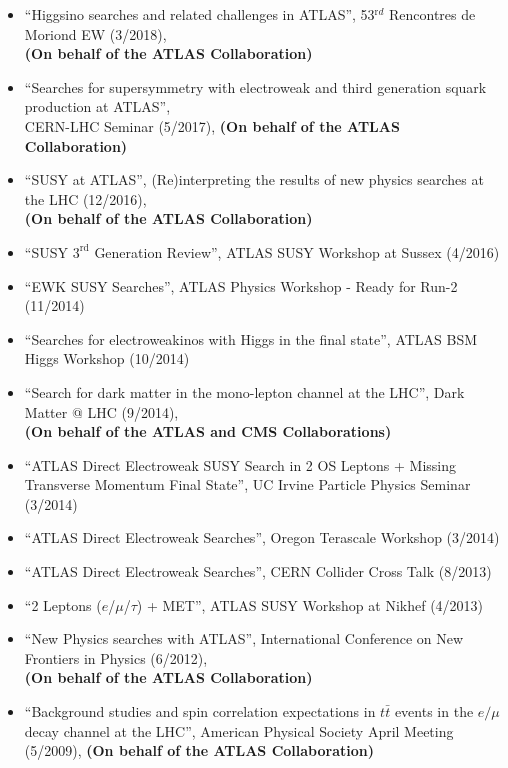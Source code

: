 \documentclass[a4paper,10pt]{article}
\begin{document}
\begin{itemize}
	\item ``Higgsino searches and related challenges in ATLAS'', 53$^{\mathrm rd}$ Rencontres de Moriond EW (3/2018),
	\\ {\bf (On behalf of the ATLAS Collaboration)}
	\item ``Searches for supersymmetry with electroweak and third generation squark production at ATLAS'', \\ CERN-LHC Seminar (5/2017), 
	{\bf (On behalf of the ATLAS Collaboration)}
	\item ``SUSY at ATLAS'', (Re)interpreting the results of new physics searches at the LHC (12/2016),
	\\ {\bf (On behalf of the ATLAS Collaboration)}
	\item ``SUSY $3^{\mathrm{rd}}$ Generation Review'', ATLAS SUSY Workshop at Sussex (4/2016)
	\item ``EWK SUSY Searches'', ATLAS Physics Workshop - Ready for Run-2  (11/2014)
	\item ``Searches for electroweakinos with Higgs in the final state'', ATLAS BSM Higgs Workshop (10/2014)
	\item  ``Search for dark matter in the mono-lepton channel at the LHC'', Dark Matter @ LHC (9/2014), 
	\\ {\bf (On behalf of the ATLAS and CMS Collaborations)}
	\item ``ATLAS Direct Electroweak SUSY Search in 2 OS Leptons + Missing Transverse Momentum Final State'', 
	UC Irvine Particle Physics Seminar (3/2014)
	\item ``ATLAS Direct Electroweak Searches'', Oregon Terascale Workshop (3/2014)
	\item ``ATLAS Direct Electroweak Searches'', CERN Collider Cross Talk (8/2013)
	\item ``2 Leptons ($e$/$\mu$/$\tau$) + MET'', ATLAS SUSY Workshop at Nikhef (4/2013)
	\item ``New Physics searches with ATLAS'', International Conference on New Frontiers in Physics (6/2012),
	\\ {\bf (On behalf of the ATLAS Collaboration)}
	\item ``Background studies and spin correlation expectations in $t\bar{t}$ events in the $e/\mu$ decay channel at the LHC'',
	American Physical Society April Meeting (5/2009), {\bf (On behalf of the ATLAS Collaboration)}
\end{itemize} 
\end{document}
